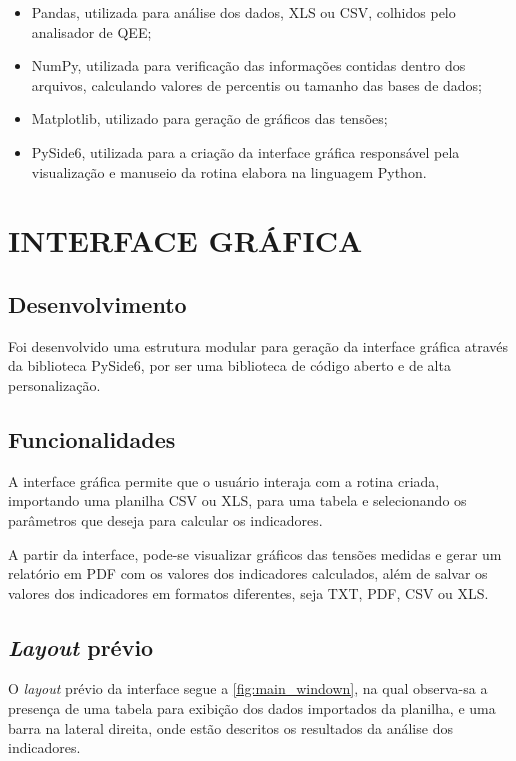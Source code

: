 \begin{itemize}
  \item Pandas, utilizada para análise dos dados, XLS ou CSV, colhidos pelo analisador de QEE;
  \item NumPy, utilizada para verificação das informações contidas dentro dos arquivos, calculando valores de percentis ou tamanho das bases de dados;
  \item Matplotlib, utilizado para geração de gráficos das tensões;
  \item PySide6, utilizada para a criação da interface gráfica responsável pela visualização e manuseio da rotina elabora na linguagem Python.
\end{itemize}

\section{INTERFACE GRÁFICA}

\subsection{Desenvolvimento}

Foi desenvolvido uma estrutura modular para geração da interface gráfica através da biblioteca PySide6, por ser uma biblioteca de código aberto e de alta personalização.

\subsection{Funcionalidades}

A interface gráfica permite que o usuário interaja com a rotina criada, importando uma planilha CSV ou XLS, para uma tabela e selecionando os parâmetros que deseja para calcular os indicadores.

A partir da interface, pode-se visualizar gráficos das tensões medidas e gerar um relatório em PDF com os valores dos indicadores calculados, além de salvar os valores dos indicadores em formatos diferentes, seja TXT, PDF, CSV ou XLS.

\subsection{\textit{Layout} prévio}

O \textit{layout} prévio da interface segue a \autoref{fig:main_windown}, na qual observa-sa a presença de uma tabela para exibição dos dados importados da planilha, e uma barra na lateral direita, onde estão descritos os resultados da análise dos indicadores.

